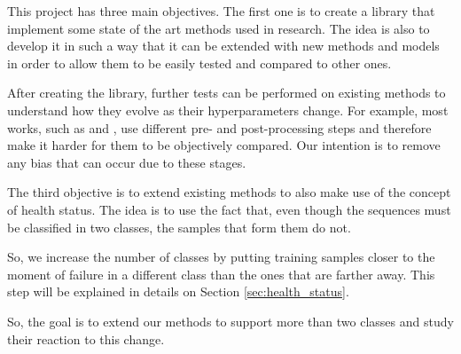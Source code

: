 This project has three main objectives.
The first one is to create a library that implement some state of the art methods used in research.
The idea is also to develop it in such a way that it can be extended with new methods and models in order to allow them to be easily tested and compared to other ones. 

After creating the library, further tests can be performed on existing methods to understand how they evolve as their hyperparameters change.
For example, most works, such as \cite{Zhu13} and \cite{Xu16}, use different pre- and post-processing steps and therefore make it harder for them to be objectively compared.
Our intention is to remove any bias that can occur due to these stages.

The third objective is to extend existing methods to also make use of the concept of health status.
The idea is to use the fact that, even though the sequences must be classified in two classes, the samples that form them do not.

So, we increase the number of classes by putting training samples closer to the moment of failure in a different class than the ones that are farther away.
This step will be explained in details on Section \ref{sec:health_status}.

So, the goal is to extend our methods to support more than two classes and study their reaction to this change.